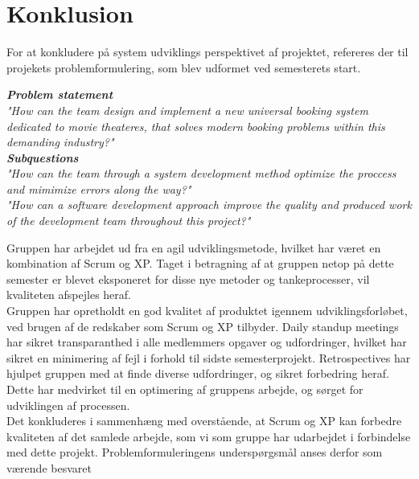 \chapter{Konklusion}\label{ch:konklusion}
For at konkludere på system udviklings perspektivet af projektet, refereres der til projekets problemformulering,
som blev udformet ved semesterets start.

\begin{center}
\textit{\textbf{Problem statement} \\
"How can the team design and implement a new universal booking system dedicated to movie theateres, 
that solves modern booking problems within this demanding industry?"} \\

\textit{\textbf{Subquestions}\\
"How can the team through a system development method optimize the proccess and mimimize errors along the way?"}\\

\textit{"How can a software development approach improve the quality and 
produced work of the development team throughout this project?"}\\
\end{center} 

Gruppen har arbejdet ud fra en agil udviklingsmetode, hvilket har været en kombination af Scrum og XP.
Taget i betragning af at gruppen netop på dette semester er blevet eksponeret for disse nye metoder og tankeprocesser,
vil kvaliteten afspejles heraf. \\

Gruppen har opretholdt en god kvalitet af produktet igennem udviklingsforløbet, 
ved brugen af de redskaber som Scrum og XP tilbyder.
Daily standup meetings har sikret transparanthed i alle medlemmers opgaver og udfordringer, hvilket har sikret
en minimering af fejl i forhold til sidste semesterprojekt. 
Retrospectives har hjulpet gruppen med at finde diverse udfordringer, og sikret forbedring heraf. Dette har medvirket
til en optimering af gruppens arbejde, og sørget for udviklingen af processen. \\

Det konkluderes i sammenhæng med overstående, at Scrum og XP kan forbedre kvaliteten af det samlede arbejde, 
som vi som gruppe har udarbejdet i forbindelse med dette projekt. Problemformuleringens underspørgsmål anses derfor
som værende besvaret